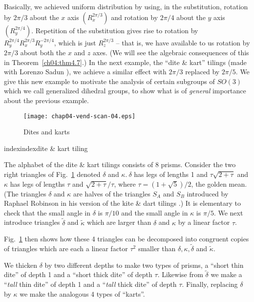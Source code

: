 \documentclass[reqno]{stml-l}
\theoremstyle{plain}
\theoremstyle{definition}
\numberwithin{equation}{chapter}
\begin{document}
Basically, we achieved uniform distribution by using, in the substitution, rotation by $2\pi/3$ about the $x$ axis $(R_{x}^{2\pi/3})$ and rotation by $2\pi/4$ about the $y$ axis $(R_{y}^{2\pi/4})$. Repetition of the substitution gives rise to rotation by $R_{y}^{2\pi/4}R_{x}^{2\pi/3}R_{y}^{-2\pi/4}$, which is just $R_{z}^{2\pi/3}$ -- that is, we have available to us rotation by $2\pi/3$ about both the $x$ and $z$ axes. (We will see the algebraic consequences of this in Theorem~\ref{ch04:thm4.7}.) In the next example, the ``dite \& kart'' tilings (made with Lorenzo Sadun \cite{bib:RS1}), we achieve a similar effect with $2\pi/3$ replaced by $2\pi/5$. We
give this new example to motivate the analysis of certain subgroups
of $SO(3)$ which we call generalized dihedral groups, to show what is
of \emph{general} importance about the previous example.

\begin{figure}[h]
\texttt{[image: chap04-vend-scan-04.eps]}
\caption{Dites and karts}
\label{ch04:fig33}
\end{figure}index{index}{dite \& kart tiling}

The alphabet of the dite \& kart tilings consists of 8 prisms. Consider the two right triangles of Fig.~\ref{ch04:fig33} denoted $\delta$ and $\kappa.\ \delta$ has legs of lengths 1 and $\tau\sqrt{2+\tau}$ and $\kappa$ has legs of lengths $\tau$ and $\sqrt{2+\tau}/\tau$, where $\tau=(1+\sqrt{5})/2$, the golden mean. (The triangles $\delta$ and $\kappa$ are halves of the triangles $S_{A}$ and $S_{B}$ introduced by Raphael Robinson in his version of the kite \& dart tilings \cite[p. 540]{bib:GrS}.) It is elementary to check that the small angle in $\delta$ is $\pi/10$ and the small angle in $\kappa$ is $\pi/5$. We next introduce triangles $\tilde{\delta}$ and $\tilde{\kappa}$ which are larger than $\delta$ and $\kappa$ by a linear factor $\tau$.

Fig.~\ref{ch04:fig33} then shows how these 4 triangles can be decomposed into congruent copies of triangles which are each a linear factor $\tau^{2}$ smaller than $\delta,\kappa,\tilde{\delta}$ and $\tilde{\kappa}$.

We thicken $\delta$ by two different depths to make two types of prisms, a ``short thin dite'' of depth 1 and a ``short thick dite'' of depth $\tau$. Likewise from $\tilde{\delta}$ we make a ``\emph{tall} thin dite'' of depth 1 and a ``\emph{tall} thick dite'' of depth $\tau$. Finally, replacing $\delta$ by $\kappa$ we make the analogous 4 types of ``karts''.
\end{document}
